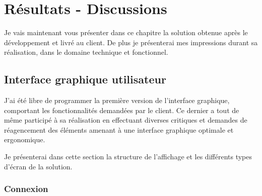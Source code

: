 \cleardoublepage

\chapter{Résultats - Discussions}

Je vais maintenant vous présenter dans ce chapitre la solution obtenue après le développement et livré au client.
De plus je présenterai mes impressions durant sa réalisation, dans le domaine technique et fonctionnel.


\section{Interface graphique utilisateur}

J'ai été libre de programmer la première version de l'interface graphique, comportant les fonctionnalités demandées par le client.
Ce dernier a tout de même participé à sa réalisation en effectuant diverses critiques et demandes de réagencement des éléments amenant à une interface graphique optimale et ergonomique.

Je présenterai dans cette section la structure de l'affichage et les différents types d'écran de la solution.


\subsection{Connexion}

